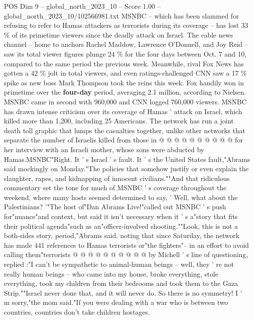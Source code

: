 \begin{textsample}{POS Dim 9 – global\_north\_2023\_10 – Score 1.00 – global\_north\_2023\_10/102566981.txt}  \label{ex:f9_pos_301}
MSNBC -- which has been slammed for refusing to refer to Hamas attackers as terrorists during its coverage -- has lost 33 \% of its primetime viewers since the deadly attack on Israel.
The cable news channel -- home to anchors Rachel Maddow, Lawrence O'Donnell, and Joy Reid -- saw its total viewer figures plunge 24 \% for the four days between Oct. 7 and 10, compared to the same period the previous week.
Meanwhile, rival Fox News has gotten a 42 \% jolt in total viewers, and even ratings-challenged CNN saw a 17 \% spike as new boss Mark Thompson took the reins this week.
Fox handily won in primetime over the \textbf{four-day} period, averaging 2.1 million, according to Nielsen.
MSNBC came in second with 960,000 and CNN logged 760,000 viewers.
MSNBC has drawn intense criticism over its coverage of Hamas ' attack on Israel, which killed more than 1,200, including 25 Americans.
The network has run a joint death toll graphic that lumps the casualties together, unlike other networks that separate the number of Israelis killed from those in @ @ @ @ @ @ @ @ @ @ for her interview with an Israeli mother, whose sons were abducted by Hamas.MSNBC"Right.
It ' s Israel ' s fault.
It ' s the United States fault,"Abrams said mockingly on Monday."The policies that somehow justify or even explain the slaughter, rapes, and kidnapping of innocent civilians.""And that ridiculous commentary set the tone for much of MSNBC ' s coverage throughout the weekend, where many hosts seemed determined to say, ' Well, what about the Palestinians? '"The host of"Dan Abrams Live!"called out MSNBC ' s push for"nuance"and context, but said it isn't necessary when it ' s a"story that fits their political agenda"such as an"officer-involved shooting.""Look, this is not a both-sides story, period,"Abrams said. noting that since Saturday, the network has made 441 references to Hamas terrorists or"the fighters"-- in an effort to avoid calling them"terrorists @ @ @ @ @ @ @ @ @ @ by Michell ' s line of questioning, replied :"I can't be sympathetic to animal-human beings -- well, they ' re not really human beings -- who came into my house, broke everything, stole everything, took my children from their bedrooms and took them to the Gaza Strip.""Israel never done that, and it will never do.
So there is no symmetry!
I ' m sorry,"the mom said."If you were dealing with a war who is between two countries, countries don't take children hostages.

\end{textsample}
